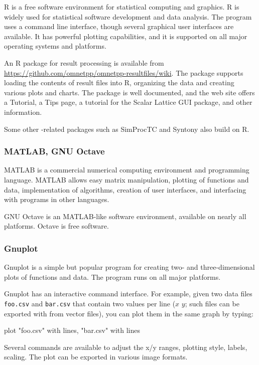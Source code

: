 R is a free software environment for statistical computing and graphics.
R is widely used for statistical software development and data analysis.
The program uses a command line interface, though several graphical user
interfaces are available. It has powerful plotting capabilities,
and it is supported on all major operating systems and platforms.

\begin{hint}
An R package for {\opp} result processing is available from
\url{https://github.com/omnetpp/omnetpp-resultfiles/wiki}.
The package supports loading the contents of {\opp} result files into R,
organizing the data and creating various plots and charts.
The package is well documented, and the web site offers a Tutorial, a Tips
page, a tutorial for the Scalar Lattice GUI package, and other information.
\end{hint}

Some other {\opp}-related packages such as SimProcTC and Syntony also build
on R.

\subsubsection{MATLAB, GNU Octave}
\label{sec:ana-sim:matlab-or-octave}

MATLAB is a commercial numerical computing environment and programming language.
MATLAB allows easy matrix manipulation, plotting of functions and data,
implementation of algorithms, creation of user interfaces, and interfacing
with programs in other languages.

GNU Octave is an MATLAB-like software environment, available on nearly all
platforms. Octave is free software.

\subsubsection{Gnuplot}
\label{sec:ana-sim:gnuplot}

Gnuplot is a simple but popular program for creating two- and three-dimensional
plots of functions and data. The program runs on all major platforms.

Gnuplot has an interactive command interface. For example, given two
data files \texttt{foo.csv} and \texttt{bar.csv} that contain
two values per line ($x$ $y$; such files can be exported with
 from vector files), you can plot them in the same
graph by typing:

\begin{commandline}
plot "foo.csv" with lines, "bar.csv" with lines
\end{commandline}

Several commands are available to adjust the x/y ranges, plotting style, labels,
scaling. The plot can be exported in various image formats.



